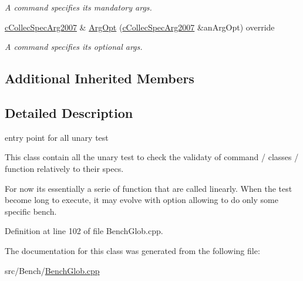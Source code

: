 \begin{DoxyCompactItemize}
\begin{DoxyCompactList}\small\item\em A command specifies its mandatory args. \end{DoxyCompactList}\item 
\hyperlink{classMMVII_1_1cCollecSpecArg2007}{c\+Collec\+Spec\+Arg2007} \& \hyperlink{classMMVII_1_1cAppli__MMVII__Bench_a1921ce64010ca746d057f6fcc153755d}{Arg\+Opt} (\hyperlink{classMMVII_1_1cCollecSpecArg2007}{c\+Collec\+Spec\+Arg2007} \&an\+Arg\+Opt) override\hypertarget{classMMVII_1_1cAppli__MMVII__Bench_a1921ce64010ca746d057f6fcc153755d}{}\label{classMMVII_1_1cAppli__MMVII__Bench_a1921ce64010ca746d057f6fcc153755d}

\begin{DoxyCompactList}\small\item\em A command specifies its optional args. \end{DoxyCompactList}\end{DoxyCompactItemize}
\subsection*{Additional Inherited Members}


\subsection{Detailed Description}
entry point for all unary test 

This class contain all the unary test to check the validaty of command / classes / function relatively to their specs.

For now its essentially a serie of function that are called linearly. When the test become long to execute, it may evolve with option allowing to do only some specific bench. 

Definition at line 102 of file Bench\+Glob.\+cpp.



The documentation for this class was generated from the following file\+:\begin{DoxyCompactItemize}
\item 
src/\+Bench/\hyperlink{BenchGlob_8cpp}{Bench\+Glob.\+cpp}\end{DoxyCompactItemize}
